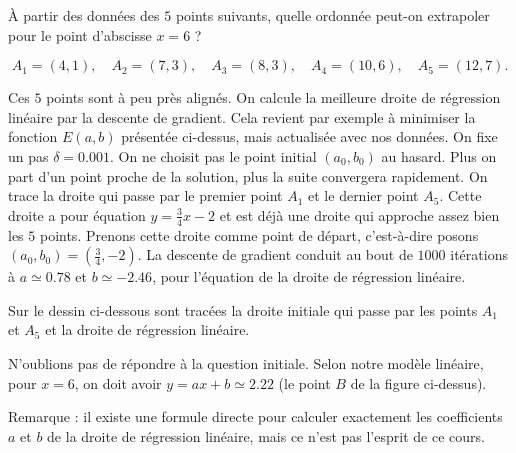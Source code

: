 \begin{exemple}{}{}
	\`A partir des données des $5$ points suivants, quelle ordonnée peut-on extrapoler pour le point d'abscisse $x=6$ ?
	
	$$A_1 = (4,1),\quad A_2 = (7,3),\quad A_3 = (8,3),\quad A_4 = (10,6),\quad A_5 = (12,7).$$
	
	Ces $5$ points sont à peu près alignés. On calcule la meilleure droite de régression linéaire par la descente de gradient. Cela revient par exemple à minimiser la fonction $E(a,b)$ présentée ci-dessus, mais actualisée avec nos données. 
	On fixe un pas $\delta = 0.001$.
	On ne choisit pas le point initial $(a_0,b_0)$ au hasard. Plus on part d'un point proche de la solution, plus la suite convergera rapidement. On trace la droite qui passe par le premier point $A_1$ et le dernier point $A_5$. Cette droite a pour équation $y=\frac34 x -2$ et est déjà une droite qui approche assez bien les $5$ points. Prenons cette droite comme point de départ, c'est-à-dire posons $(a_0,b_0) = (\frac34,-2)$.
	La descente de gradient conduit au bout de $1000$ itérations à $a\simeq 0.78$ et $b\simeq -2.46$, pour l'équation de la droite de régression linéaire.
	
	Sur le dessin ci-dessous sont tracées la droite initiale qui passe par les points $A_1$ et $A_5$ et la droite de régression linéaire.
	
	
	N'oublions pas de répondre à la question initiale. Selon notre modèle linéaire, pour $x=6$, on doit avoir $y=ax+b \simeq 2.22$ (le point $B$ de la figure ci-dessus).
\end{exemple}

Remarque : il existe une formule directe pour calculer exactement les coefficients $a$ et $b$ de la droite de régression linéaire, mais ce n'est pas l'esprit de ce cours.


